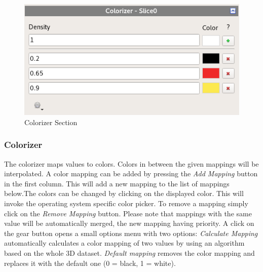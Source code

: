 \begin{figure}[h]
  \centering
  \includegraphics[scale=0.5]{img/2d/colorizer.png}
  \caption{Colorizer Section}
\end{figure}

\subsubsection{Colorizer}\label{sec:Colorizer}

The colorizer maps values to colors. Colors in between the given mappings will be interpolated. A color mapping can be added by pressing the \emph{Add Mapping} button in the first column. This will add a new mapping to the list of mappings below.\newline The colors can be changed by clicking on the displayed color. This will invoke the operating system specific color picker. \newline To remove a mapping simply click on the \emph{Remove Mapping} button. \newline Please note that mappings with the same value will be automatically merged, the new mapping having priority. \newline A click on the gear button opens a small options menu with two options: \emph{Calculate Mapping} automatically calculates a color mapping of two values by using an algorithm based on the whole 3D dataset. \emph{Default mapping} removes the color mapping and replaces it with the default one (0 = black, 1 = white).

